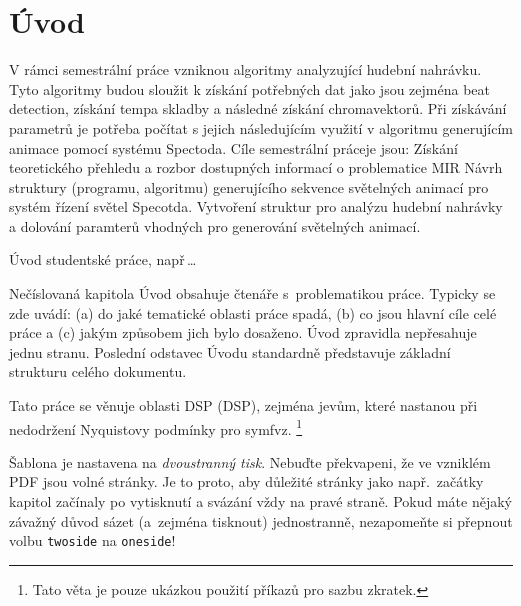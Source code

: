 \chapter*{Úvod}
{}

V rámci semestrální práce vzniknou algoritmy analyzující hudební nahrávku.
Tyto algoritmy budou sloužit k získání potřebných dat jako jsou zejména beat detection,
získání tempa skladby a následné získání chromavektorů.
Při získávání parametrů je potřeba počítat s jejich následujícím využití v algoritmu generujícím animace pomocí systému Spectoda. 
\bigskip
Cíle semestrální práceje jsou:
    Získání teoretického přehledu a rozbor dostupných informací o problematice MIR
    Návrh struktury (programu, algoritmu) generujícího sekvence světelných animací pro systém řízení světel Specotda.
    Vytvoření struktur pro analýzu hudební nahrávky a dolování paramterů vhodných pro generování světelných animací.

\bigskip

Úvod studentské práce, např\,\dots

Nečíslovaná kapitola Úvod obsahuje  čtenáře s~problematikou práce.
Typicky se zde uvádí:
(a) do jaké tematické oblasti práce spadá, (b) co jsou hlavní cíle celé práce a (c) jakým způsobem jich bylo dosaženo.
Úvod zpravidla nepřesahuje jednu stranu.
Poslední odstavec Úvodu standardně představuje základní strukturu celého dokumentu.

Tato práce se věnuje oblasti \acs{DSP} (\acl{DSP}), zejména jevům, které nastanou při nedodržení Nyquistovy podmínky pro \ac{symfvz}.%
\footnote{Tato věta je pouze ukázkou použití příkazů pro sazbu zkratek.}

Šablona je nastavena na \emph{dvoustranný tisk}.
Nebuďte překvapeni, že ve vzniklém PDF jsou volné stránky.
Je to proto, aby důležité stránky jako např.\ začátky kapitol začínaly po vytisknutí a svázání vždy na pravé straně.
%
Pokud máte nějaký závažný důvod sázet (a~zejména tisknout) jednostranně, nezapomeňte si přepnout volbu \texttt{twoside} na \texttt{oneside}!